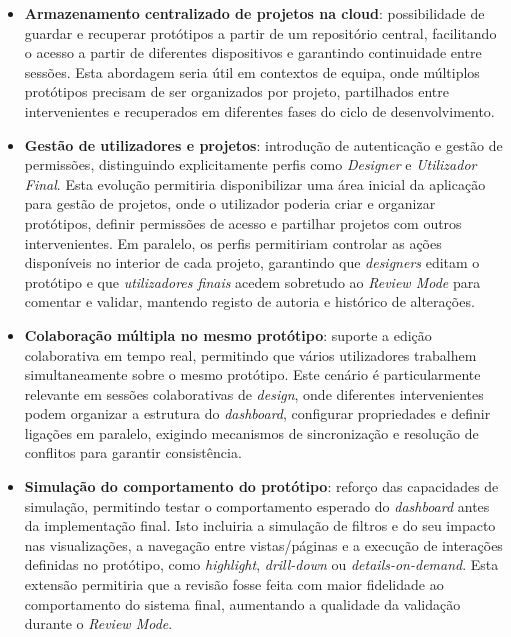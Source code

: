 \begin{itemize}
    \item \textbf{Armazenamento centralizado de projetos na cloud}: possibilidade de guardar e recuperar protótipos a partir de um repositório central, facilitando o acesso a partir de diferentes dispositivos e garantindo continuidade entre sessões. Esta abordagem seria útil em contextos de equipa, onde múltiplos protótipos precisam de ser organizados por projeto, partilhados entre intervenientes e recuperados em diferentes fases do ciclo de desenvolvimento.

    \item \textbf{Gestão de utilizadores e projetos}: introdução de autenticação e gestão de permissões, distinguindo explicitamente perfis como \textit{Designer} e \textit{Utilizador Final}. Esta evolução permitiria disponibilizar uma área inicial da aplicação para gestão de projetos, onde o utilizador poderia criar e organizar protótipos, definir permissões de acesso e partilhar projetos com outros intervenientes. Em paralelo, os perfis permitiriam controlar as ações disponíveis no interior de cada projeto, garantindo que \textit{designers} editam o protótipo e que \textit{utilizadores finais} acedem sobretudo ao \textit{Review Mode} para comentar e validar, mantendo registo de autoria e histórico de alterações.

    \item \textbf{Colaboração múltipla no mesmo protótipo}: suporte a edição colaborativa em tempo real, permitindo que vários utilizadores trabalhem simultaneamente sobre o mesmo protótipo. Este cenário é particularmente relevante em sessões colaborativas de \textit{design}, onde diferentes intervenientes podem organizar a estrutura do \textit{dashboard}, configurar propriedades e definir ligações em paralelo, exigindo mecanismos de sincronização e resolução de conflitos para garantir consistência.

    \item \textbf{Simulação do comportamento do protótipo}: reforço das capacidades de simulação, permitindo testar o comportamento esperado do \textit{dashboard} antes da implementação final. Isto incluiria a simulação de filtros e do seu impacto nas visualizações, a navegação entre vistas/páginas e a execução de interações definidas no protótipo, como \textit{highlight}, \textit{drill-down} ou \textit{details-on-demand}. Esta extensão permitiria que a revisão fosse feita com maior fidelidade ao comportamento do sistema final, aumentando a qualidade da validação durante o \textit{Review Mode}.
\end{itemize}

